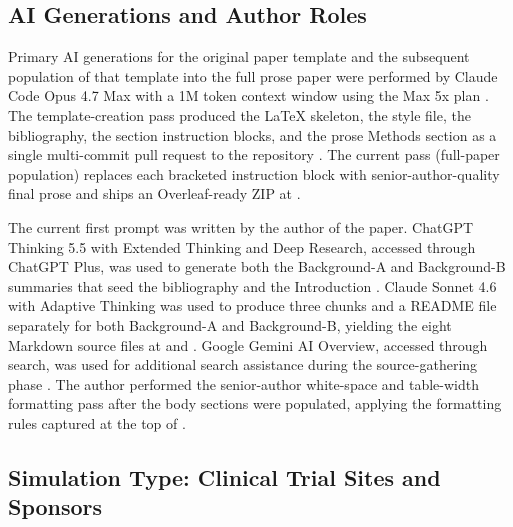 
\subsection{AI Generations and Author Roles}
\label{sec:methods-ai}

Primary AI generations for the original paper template and the
subsequent population of that template into the full prose paper were
performed by Claude Code Opus 4.7 Max with a 1M token context window
using the Max 5x plan \cite{claude-opus-47, claude-code}. The
template-creation pass produced the LaTeX skeleton, the style file,
the bibliography, the section instruction blocks, and the prose
Methods section as a single multi-commit pull request to the
 repository
\cite{main-repo}. The current pass (full-paper population) replaces
each bracketed instruction block with senior-author-quality final prose
and ships an Overleaf-ready ZIP at
.

The current first prompt was written by the author of the paper.
ChatGPT Thinking 5.5 with Extended Thinking and Deep Research, accessed
through ChatGPT Plus, was used to generate both the Background-A and
Background-B summaries that seed the bibliography and the Introduction
\cite{chatgpt-thinking}. Claude Sonnet 4.6 with Adaptive Thinking was
used to produce three chunks and a README file separately for both
Background-A and Background-B, yielding the eight Markdown source
files at  and
\cite{claude-sonnet-46}. Google Gemini AI Overview, accessed through
 search, was used for additional search assistance
during the source-gathering phase \cite{google-gemini-overview}. The
author performed the senior-author white-space and table-width
formatting pass after the body sections were populated, applying the
formatting rules captured at the top of .

\subsection{Simulation Type: Clinical Trial Sites and Sponsors}
\label{sec:methods-sim-type}

